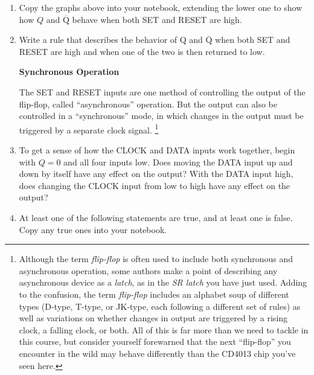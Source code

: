 \begin{enumerate}[wide]
\item Copy the graphs above into your notebook, extending the lower one to show how $Q$ and $\mathrm{\overline{Q}}$ behave when both SET and RESET are high.
\label{both_set_and_reset}

\item Write a rule that describes the behavior of Q and $\mathrm{\overline{Q}}$ when both SET and RESET are high and when one of the two is then returned to low.

\pagebreak[3]
\textbf{Synchronous Operation}

The SET and RESET inputs are one method of controlling the output of the flip-flop, called ``asynchronous'' operation.  But the output can also be controlled in a ``synchronous'' mode, in which changes in the output must be triggered by a separate clock signal.%
\footnote{Although the term \textit{flip-flop} is often used to include both synchronous and asynchronous operation, some authors make a point of describing any asynchronous device as a \textit{latch}, as in the \textit{SR latch} you have just used.  Adding to the confusion, the term \textit{flip-flop} includes an alphabet soup of different types (D-type, T-type, or JK-type, each following a different set of rules) as well as variations on whether changes in output are triggered by a rising clock, a falling clock, or both. All of this is far more than we need to tackle in this course, but consider yourself forewarned that the next ``flip-flop'' you encounter in the wild may behave differently than the CD4013 chip you've seen here.}

\item To get a sense of how the CLOCK and DATA inputs work together, begin with $Q=0$ and all four inputs low. Does moving the DATA input up and down by itself have any effect on the output? With the DATA input high, does changing the CLOCK input from low to high have any effect on the output?


\item At least one of the following statements are true, and at least one is false.  Copy any true ones into your notebook.


\end{enumerate}
